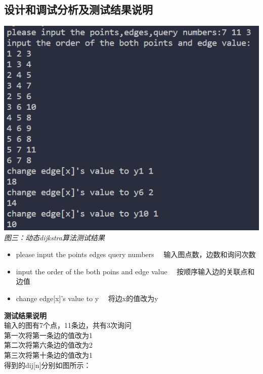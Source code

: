 \documentclass[UTF8,a4paper]{article}
\begin{document}
\subsection{设计和调试分析及测试结果说明}
\begin{center}
\includegraphics[scale=0.5]{dym-dijktra.png}\\
\textit{图三：动态dijkstra算法测试结果}
\end{center}
\begin{itemize}
    \item please input the points edges query numbers ~~输入图点数，边数和询问次数
    \item input the order of the both poins and edge value ~~按顺序输入边的关联点和边值
    \item change edge[x]'s value to y ~~将边x的值改为y
\end{itemize}
\textbf{测试结果说明}\\
输入的图有7个点，11条边，共有3次询问\\
第一次将第一条边的值改为1\\
第二次将第六条边的值改为2\\
第三次将第十条边的值改为1\\
得到的dij[n]分别如图所示：\\[1cm]
\end{document}
